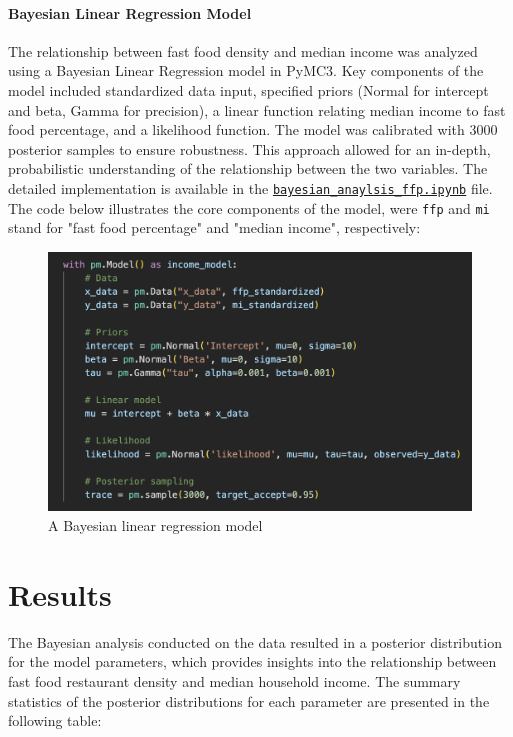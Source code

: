 \documentclass[12pt]{article}
\begin{document}
\paragraph{Bayesian Linear Regression Model}
The relationship between fast food density and median income was analyzed using a Bayesian Linear Regression model in PyMC3. Key components of the model included standardized data input, specified priors (Normal for intercept and beta, Gamma for precision), a linear function relating median income to fast food percentage, and a likelihood function. The model was calibrated with 3000 posterior samples to ensure robustness. This approach allowed for an in-depth, probabilistic understanding of the relationship between the two variables. The detailed implementation is available in the \href{https://github.com/cucupac/bayesian-stats/blob/main/project/bayesian_analysis_ffp.ipynb}{\texttt{bayesian\_anaylsis\_ffp.ipynb}} file. The code below illustrates the core components of the model, were \texttt{ffp} and \texttt{mi} stand for "fast food percentage" and "median income", respectively:

\begin{figure}[h!]
\centering
\includegraphics[width=1.0\textwidth]{../assets/model.png} 
\caption{A Bayesian linear regression model}
\label{fig:cond_prob}
\end{figure}

\newpage
\section*{Results}

\noindent The Bayesian analysis conducted on the data resulted in a posterior distribution for the model parameters, which provides insights into the relationship between fast food restaurant density and median household income. The summary statistics of the posterior distributions for each parameter are presented in the following table:
\end{document}

